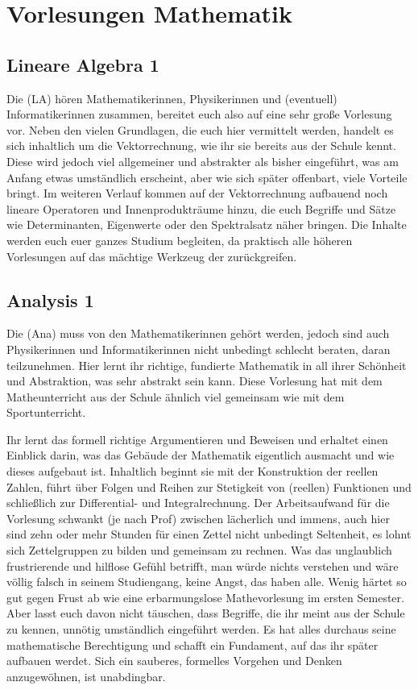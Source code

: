 \section*{Vorlesungen Mathematik}

\subsection{Lineare Algebra 1}
\label{la1}
Die  (\gls{LA}) hören Mathematikerinnen, Physikerinnen und (eventuell) Informatikerinnen zusammen, bereitet euch also auf eine sehr große Vorlesung vor. Neben den vielen Grundlagen, die euch hier vermittelt werden, handelt es sich inhaltlich um die Vektorrechnung, wie ihr sie bereits aus der Schule kennt. Diese wird jedoch viel allgemeiner und abstrakter als bisher eingeführt, was am Anfang etwas umständlich erscheint, aber wie sich später offenbart, viele Vorteile bringt. Im weiteren Verlauf kommen auf der Vektorrechnung aufbauend noch lineare Operatoren und Innenprodukträume hinzu, die euch Begriffe und Sätze wie Determinanten, Eigenwerte oder den Spektralsatz näher bringen. Die Inhalte werden euch euer ganzes Studium begleiten, da praktisch alle höheren Vorlesungen auf das mächtige Werkzeug der  zurückgreifen.

\vspace{-2mm}
\subsection{Analysis 1}
\label{ana1}
Die  (\gls{Ana}) muss von den Mathematikerinnen gehört werden, jedoch sind auch Physikerinnen und Informatikerinnen nicht unbedingt schlecht beraten, daran teilzunehmen. Hier lernt ihr richtige, fundierte Mathematik in all ihrer Schönheit und Abstraktion, was sehr abstrakt sein kann. Diese Vorlesung hat mit dem Matheunterricht aus der Schule ähnlich viel gemeinsam wie mit dem Sportunterricht.

Ihr lernt das formell richtige Argumentieren und Beweisen und erhaltet einen Einblick darin, was das Gebäude der Mathematik eigentlich ausmacht und wie dieses aufgebaut ist. Inhaltlich beginnt sie mit der Konstruktion der reellen Zahlen, führt über Folgen und Reihen zur Stetigkeit von (reellen) Funktionen und schließlich zur Differential- und Integralrechnung. Der Arbeitsaufwand für die Vorlesung schwankt (je nach Prof) zwischen lächerlich und immens, auch hier sind zehn oder mehr Stunden für einen Zettel nicht unbedingt Seltenheit, es lohnt sich Zettelgruppen zu bilden und gemeinsam zu rechnen. Was das unglaublich frustrierende und hilflose Gefühl betrifft, man würde nichts verstehen und wäre völlig falsch in seinem Studiengang, keine Angst, das haben alle. Wenig härtet so gut gegen Frust ab wie eine erbarmungslose Mathevorlesung im ersten Semester. Aber lasst euch davon nicht täuschen, dass Begriffe, die ihr meint aus der Schule zu kennen, unnötig umständlich eingeführt werden. Es hat alles durchaus seine mathematische Berechtigung und schafft ein Fundament, auf das ihr später aufbauen werdet. Sich ein sauberes, formelles Vorgehen und Denken anzugewöhnen, ist unabdingbar.
